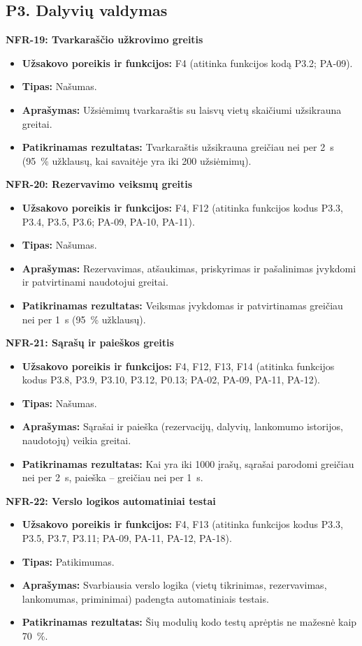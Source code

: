 \subsection{P3. Dalyvių valdymas}

\noindent\textbf{NFR-19: Tvarkaraščio užkrovimo greitis}
\begin{itemize}
    \item \textbf{Užsakovo poreikis ir funkcijos:} F4 (atitinka funkcijos kodą P3.2; PA-09).
    \item \textbf{Tipas:} Našumas.
    \item \textbf{Aprašymas:} Užsiėmimų tvarkaraštis su laisvų vietų skaičiumi užsikrauna greitai.
    \item \textbf{Patikrinamas rezultatas:} Tvarkaraštis užsikrauna greičiau nei per 2~s (95~\% užklausų, kai savaitėje yra iki 200 užsiėmimų).
\end{itemize}

\noindent\textbf{NFR-20: Rezervavimo veiksmų greitis}
\begin{itemize}
    \item \textbf{Užsakovo poreikis ir funkcijos:} F4, F12 (atitinka funkcijos kodus P3.3, P3.4, P3.5, P3.6; PA-09, PA-10, PA-11).
    \item \textbf{Tipas:} Našumas.
    \item \textbf{Aprašymas:} Rezervavimas, atšaukimas, priskyrimas ir pašalinimas įvykdomi ir patvirtinami naudotojui greitai.
    \item \textbf{Patikrinamas rezultatas:} Veiksmas įvykdomas ir patvirtinamas greičiau nei per 1~s (95~\% užklausų).
\end{itemize}

\noindent\textbf{NFR-21: Sąrašų ir paieškos greitis}
\begin{itemize}
    \item \textbf{Užsakovo poreikis ir funkcijos:} F4, F12, F13, F14 (atitinka funkcijos kodus P3.8, P3.9, P3.10, P3.12, P0.13; PA-02, PA-09, PA-11, PA-12).
    \item \textbf{Tipas:} Našumas.
    \item \textbf{Aprašymas:} Sąrašai ir paieška (rezervacijų, dalyvių, lankomumo istorijos, naudotojų) veikia greitai.
    \item \textbf{Patikrinamas rezultatas:} Kai yra iki 1000 įrašų, sąrašai parodomi greičiau nei per 2~s, paieška -- greičiau nei per 1~s.
\end{itemize}

\noindent\textbf{NFR-22: Verslo logikos automatiniai testai}
\begin{itemize}
    \item \textbf{Užsakovo poreikis ir funkcijos:} F4, F13 (atitinka funkcijos kodus P3.3, P3.5, P3.7, P3.11; PA-09, PA-11, PA-12, PA-18).
    \item \textbf{Tipas:} Patikimumas.
    \item \textbf{Aprašymas:} Svarbiausia verslo logika (vietų tikrinimas, rezervavimas, lankomumas, priminimai) padengta automatiniais testais.
    \item \textbf{Patikrinamas rezultatas:} Šių modulių kodo testų aprėptis ne mažesnė kaip 70~\%.
\end{itemize}

